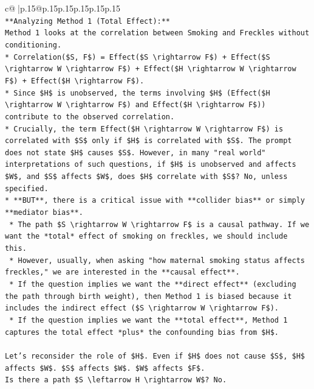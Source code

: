\documentclass{article}
\begin{document}
{\begin{supertabular}{c@{$\;$}|p{.15\linewidth}@{}p{.15\linewidth}p{.15\linewidth}p{.15\linewidth}p{.15\linewidth}p{.15\linewidth}}
{{{\\ 
\texttt{**Analyzing Method 1 (Total Effect):**} \\
\texttt{Method 1 looks at the correlation between Smoking and Freckles without conditioning.} \\
\texttt{*   Correlation(\$S, F\$) = Effect(\$S \textbackslash{}rightarrow F\$) + Effect(\$S \textbackslash{}rightarrow W \textbackslash{}rightarrow F\$) + Effect(\$H \textbackslash{}rightarrow W \textbackslash{}rightarrow F\$) + Effect(\$H \textbackslash{}rightarrow F\$).} \\
\texttt{*   Since \$H\$ is unobserved, the terms involving \$H\$ (Effect(\$H \textbackslash{}rightarrow W \textbackslash{}rightarrow F\$) and Effect(\$H \textbackslash{}rightarrow F\$)) contribute to the observed correlation.} \\
\texttt{*   Crucially, the term Effect(\$H \textbackslash{}rightarrow W \textbackslash{}rightarrow F\$) is correlated with \$S\$ only if \$H\$ is correlated with \$S\$. The prompt does not state \$H\$ causes \$S\$. However, in many "real world" interpretations of such questions, if \$H\$ is unobserved and affects \$W\$, and \$S\$ affects \$W\$, does \$H\$ correlate with \$S\$? No, unless specified.} \\
\texttt{*   **BUT**, there is a critical issue with **collider bias** or simply **mediator bias**.} \\
\texttt{    *   The path \$S \textbackslash{}rightarrow W \textbackslash{}rightarrow F\$ is a causal pathway. If we want the *total* effect of smoking on freckles, we should include this.} \\
\texttt{    *   However, usually, when asking "how maternal smoking status affects freckles," we are interested in the **causal effect**.} \\
\texttt{    *   If the question implies we want the **direct effect** (excluding the path through birth weight), then Method 1 is biased because it includes the indirect effect (\$S \textbackslash{}rightarrow W \textbackslash{}rightarrow F\$).} \\
\texttt{    *   If the question implies we want the **total effect**, Method 1 captures the total effect *plus* the confounding bias from \$H\$.} \\
\\ 
\texttt{Let's reconsider the role of \$H\$. Even if \$H\$ does not cause \$S\$, \$H\$ affects \$W\$. \$S\$ affects \$W\$. \$W\$ affects \$F\$.} \\
\texttt{Is there a path \$S \textbackslash{}leftarrow H \textbackslash{}rightarrow W\$? No.} \\
}}}
\end{supertabular}}
\end{document}
